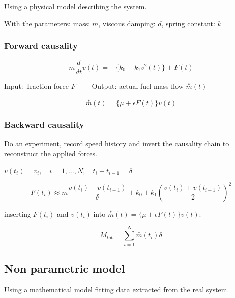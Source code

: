 \documentclass[10pt,a4paper]{scrartcl}
\begin{document}
\begin{multicols*}{3}
Using a physical model describing the system.



With the parameters: mass: $m$, viscous damping: $d$, spring constant: $k$

\subsubsection{Forward causality}


\begin{equation*}
m\frac{d}{dt}v(t)=-\{k_0+k_1v^2(t)\}+F(t)
\end{equation*}

\small
Input: Traction force $F\qquad$ Output: actual fuel mass flow $\overset{\ast}{m}(t)$\normalsize

\begin{equation*}
\overset{\ast}{m}(t)=\{\mu+\epsilon F(t)\}v(t)
\end{equation*}

\subsubsection{Backward causality}

Do an experiment, record speed history and invert the causality chain to reconstruct the applied forces.


$v(t_i)=v_i,\quad i=1,\ldots,N,\quad t_i-t_{i-1}=\delta$

\begin{equation*}F(t_i)\approx m\frac{v(t_i)-v(t_{i-1})}{\delta}+k_0+k_1\left(\frac{v(t_i)+v(t_{i-1})}{2}\right)^2
\end{equation*}

inserting $F(t_i)$ and $v(t_i)$ into $\overset{\ast}{m}(t)=\{\mu+\epsilon F(t)\}v(t)$:

\begin{equation*}
M_{tot}=\sum\limits_{i=1}^N\overset{\ast}{m}(t_i)\delta
\end{equation*}


\subsection{Non parametric model}

Using a mathematical model fitting data extracted from the real system.


\end{multicols*}
\end{document}
